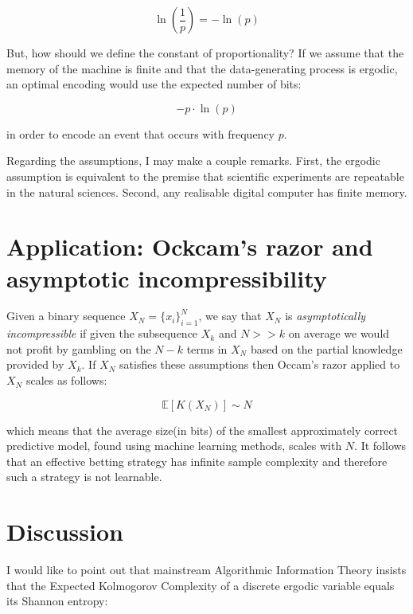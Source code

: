 \documentclass{article}
\begin{document}
\begin{equation}
\ln(\frac{1}{p}) = - \ln(p)
\end{equation}

But, how should we define the constant of proportionality? If we assume that the memory of the machine is finite and that
the data-generating process is ergodic, an optimal encoding would use the expected number of bits:

\begin{equation}
-p \cdot \ln(p)
\end{equation}

in order to encode an event that occurs with frequency $p$.

Regarding the assumptions, I may make a couple remarks. First, the ergodic assumption is equivalent to the premise that
scientific experiments are repeatable in the natural sciences. Second, any realisable digital computer has finite memory. 

\newpage 

\section{Application: Ockcam's razor and asymptotic incompressibility}

Given a binary sequence $X_N = \{x_i\}_{i=1}^N$, we say that $X_N$ is \textit{asymptotically incompressible} if given the subsequence $X_k$ and $N >>k$ 
on average we would not profit by gambling on the $N-k$ terms in $X_N$ based 
on the partial knowledge provided by $X_k$. If $X_N$ satisfies these assumptions then Occam's razor applied to $X_N$ scales as follows: 

\begin{equation}
\mathbb{E}[K(X_N)] \sim N	
\end{equation}

which means that the average size(in bits) of the smallest approximately correct predictive model, found using machine learning methods, scales with $N$. It follows that an effective betting strategy has infinite sample complexity and therefore such a strategy is not learnable.  

\section{Discussion}

I would like to point out that mainstream Algorithmic Information Theory insists that the Expected Kolmogorov Complexity
of a discrete ergodic variable equals its Shannon entropy:
\end{document}
